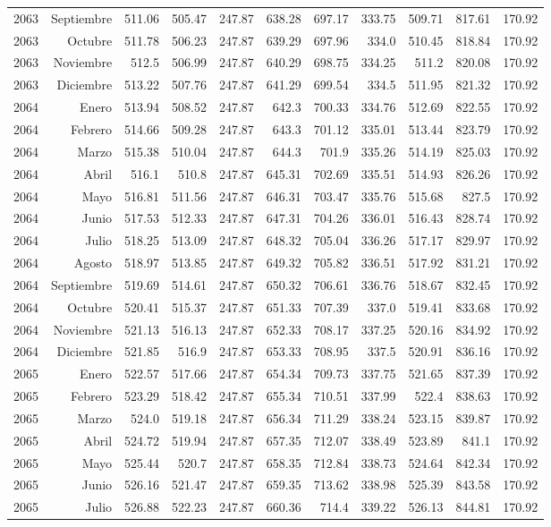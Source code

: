 \documentclass{article}%
\begin{document}
\begin{longtable}{|l r|r|r|r|r|r|r|r|r|r|}
2063&Septiembre&511.06&505.47&247.87&638.28&697.17&333.75&509.71&817.61&170.92\\%
2063&Octubre&511.78&506.23&247.87&639.29&697.96&334.0&510.45&818.84&170.92\\%
2063&Noviembre&512.5&506.99&247.87&640.29&698.75&334.25&511.2&820.08&170.92\\%
2063&Diciembre&513.22&507.76&247.87&641.29&699.54&334.5&511.95&821.32&170.92\\%
2064&Enero&513.94&508.52&247.87&642.3&700.33&334.76&512.69&822.55&170.92\\%
2064&Febrero&514.66&509.28&247.87&643.3&701.12&335.01&513.44&823.79&170.92\\%
2064&Marzo&515.38&510.04&247.87&644.3&701.9&335.26&514.19&825.03&170.92\\%
2064&Abril&516.1&510.8&247.87&645.31&702.69&335.51&514.93&826.26&170.92\\%
2064&Mayo&516.81&511.56&247.87&646.31&703.47&335.76&515.68&827.5&170.92\\%
2064&Junio&517.53&512.33&247.87&647.31&704.26&336.01&516.43&828.74&170.92\\%
2064&Julio&518.25&513.09&247.87&648.32&705.04&336.26&517.17&829.97&170.92\\%
2064&Agosto&518.97&513.85&247.87&649.32&705.82&336.51&517.92&831.21&170.92\\%
2064&Septiembre&519.69&514.61&247.87&650.32&706.61&336.76&518.67&832.45&170.92\\%
2064&Octubre&520.41&515.37&247.87&651.33&707.39&337.0&519.41&833.68&170.92\\%
2064&Noviembre&521.13&516.13&247.87&652.33&708.17&337.25&520.16&834.92&170.92\\%
2064&Diciembre&521.85&516.9&247.87&653.33&708.95&337.5&520.91&836.16&170.92\\%
2065&Enero&522.57&517.66&247.87&654.34&709.73&337.75&521.65&837.39&170.92\\%
2065&Febrero&523.29&518.42&247.87&655.34&710.51&337.99&522.4&838.63&170.92\\%
2065&Marzo&524.0&519.18&247.87&656.34&711.29&338.24&523.15&839.87&170.92\\%
2065&Abril&524.72&519.94&247.87&657.35&712.07&338.49&523.89&841.1&170.92\\%
2065&Mayo&525.44&520.7&247.87&658.35&712.84&338.73&524.64&842.34&170.92\\%
2065&Junio&526.16&521.47&247.87&659.35&713.62&338.98&525.39&843.58&170.92\\%
2065&Julio&526.88&522.23&247.87&660.36&714.4&339.22&526.13&844.81&170.92\\%
\hline%
\end{longtable}

%
\end{document}
